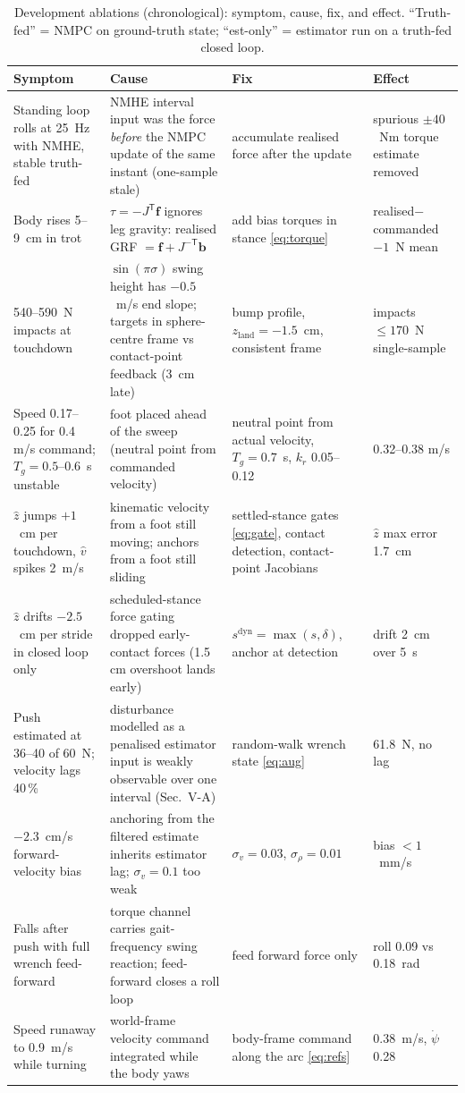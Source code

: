 \documentclass[11pt]{article}
\newcommand{\T}{^{\mathsf T}}
\newcommand{\bfv}{\bm{f}}\newcommand{\br}{\bm{r}}\newcommand{\bd}{\bm{d}}\newcommand{\bs}{\bm{s}}
\begin{document}
\begin{table}[t]\centering\caption{Development ablations (chronological): symptom, cause, fix, and effect. ``Truth-fed'' = NMPC on ground-truth state; ``est-only'' = estimator run on a truth-fed closed loop.}\label{tab:lessons}
\footnotesize\begin{tabular}{@{}p{3.2cm}p{4.7cm}p{4.2cm}p{3.0cm}@{}}\toprule
Symptom & Cause & Fix & Effect\\\midrule
Standing loop rolls at 25~Hz with NMHE, stable truth-fed & NMHE interval input was the force \emph{before} the NMPC update of the same instant (one-sample stale) & accumulate realised force after the update & spurious $\pm40$~Nm torque estimate removed\\
Body rises 5--9~cm in trot & $\tau=-J\T\bfv$ ignores leg gravity: realised GRF $=\bfv+J^{-\mathsf T}\bm b$ & add bias torques in stance \eqref{eq:torque} & realised$-$commanded $-1$~N mean\\
540--590~N impacts at touchdown & $\sin(\pi\sigma)$ swing height has $-0.5$~m/s end slope; targets in sphere-centre frame vs contact-point feedback (3~cm late) & bump profile, $z_{\mathrm{land}}=-1.5$~cm, consistent frame & impacts $\le170$~N single-sample\\
Speed 0.17--0.25 for 0.4 m/s command; $T_g=0.5$--$0.6$~s unstable & foot placed ahead of the sweep (neutral point from commanded velocity) & neutral point from actual velocity, $T_g=0.7$~s, $k_r$ 0.05--0.12 & 0.32--0.38 m/s\\
$\hat z$ jumps $+1$~cm per touchdown, $\hat v$ spikes 2~m/s & kinematic velocity from a foot still moving; anchors from a foot still sliding & settled-stance gates \eqref{eq:gate}, contact detection, contact-point Jacobians & $\hat z$ max error 1.7~cm\\
$\hat z$ drifts $-2.5$~cm per stride in closed loop only & scheduled-stance force gating dropped early-contact forces (1.5 cm overshoot lands early) & $s^{\mathrm{dyn}}=\max(s,\delta)$, anchor at detection & drift 2~cm over 5~s\\
Push estimated at 36--40 of 60~N; velocity lags 40\,\% & disturbance modelled as a penalised estimator input is weakly observable over one interval (Sec.~V-A) & random-walk wrench state \eqref{eq:aug} & 61.8~N, no lag\\
$-2.3$~cm/s forward-velocity bias & anchoring from the filtered estimate inherits estimator lag; $\sigma_v=0.1$ too weak & $\sigma_v=0.03$, $\sigma_\rho=0.01$ & bias $<1$~mm/s\\
Falls after push with full wrench feed-forward & torque channel carries gait-frequency swing reaction; feed-forward closes a roll loop & feed forward force only & roll 0.09 vs 0.18~rad\\
Speed runaway to 0.9~m/s while turning & world-frame velocity command integrated while the body yaws & body-frame command along the arc \eqref{eq:refs} & 0.38~m/s, $\dot\psi$ 0.28\\
\bottomrule\end{tabular}\end{table}
\end{document}
